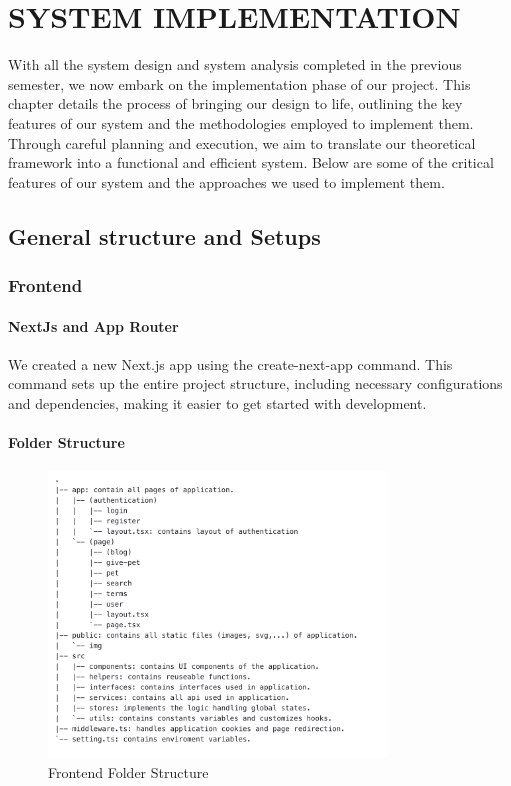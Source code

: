 \chapter{SYSTEM IMPLEMENTATION}
With all the system design and system analysis completed in the previous semester, we now embark on the implementation phase of our project. This chapter details the process of bringing our design to life, outlining the key features of our system and the methodologies employed to implement them. Through careful planning and execution, we aim to translate our theoretical framework into a functional and efficient system. Below are some of the critical features of our system and the approaches we used to implement them.

\section{General structure and Setups}
\subsection{Frontend}

\subsubsection*{NextJs and App Router}
We created a new Next.js app using the create-next-app command. This command sets up the entire project structure, including necessary configurations and dependencies, making it easier to get started with development.


\subsubsection*{Folder Structure}
\begin{figure}[H]
    \centering
    \includegraphics[width=0.8\textwidth]{Figures/Implementation/folder_fe.png}
    \caption{Frontend Folder Structure}
    \label{fig:folder-structure-fe}
\end{figure}

